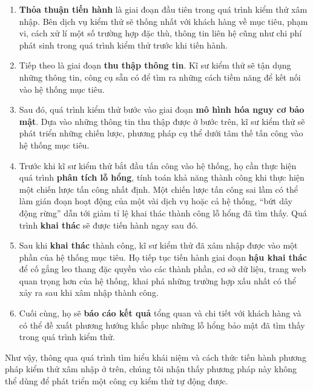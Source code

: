 \begin{enumerate}
    \item \textbf{Thỏa thuận tiến hành} là giai đoạn đầu tiên trong quá trình kiểm thử xâm nhập. Bên dịch vụ kiểm thử sẽ thống nhất với khách hàng về mục tiêu, phạm vi, cách xử lí một số trường hợp đặc thù, thông tin liên hệ cũng như chi phí phát sinh trong quá trình kiểm thử trước khi tiến hành.
    \item Tiếp theo là giai đoạn \textbf{thu thập thông tin}. Kĩ sư kiểm thử sẽ tận dụng những thông tin, công cụ sẵn có để tìm ra những cách tiềm năng để kết nối vào hệ thống mục tiêu.
    \item Sau đó, quá trình kiểm thử bước vào giai đoạn \textbf{mô hình hóa nguy cơ bảo mật}. Dựa vào những thông tin thu thập được ở bước trên, kĩ sư kiểm thử sẽ phát triển những chiến lược, phương pháp cụ thể dưới tâm thế tấn công vào hệ thống mục tiêu.
    \item Trước khi kĩ sư kiểm thử bắt đầu tấn công vào hệ thống, họ cần thực hiện quá trình \textbf{phân tích lỗ hổng}, tính toán khả năng thành công khi thực hiện một chiến lược tấn công nhất định. Một chiến lược tấn công sai lầm có thể làm gián đoạn hoạt động của một vài dịch vụ hoặc cả hệ thống, ``bứt dây động rừng'' dẫn tới giảm tỉ lệ khai thác thành công lỗ hổng đã tìm thấy. Quá trình \textbf{khai thác} sẽ được tiến hành ngay sau đó.
    \item Sau khi \textbf{khai thác} thành công, kĩ sư kiểm thử đã xâm nhập được vào một phần của hệ thống mục tiêu. Họ tiếp tục tiến hành giai đoạn \textbf{hậu khai thác} để cố gắng leo thang đặc quyền vào các thành phần, cơ sở dữ liệu, trang web quan trọng hơn của hệ thống, khai phá những trường hợp xấu nhất có thể xảy ra sau khi xâm nhập thành công.
    \item Cuối cùng, họ sẽ \textbf{báo cáo kết quả} tổng quan và chi tiết với khách hàng và có thể đề xuất phương hướng khắc phục những lỗ hổng bảo mật đã tìm thấy trong quá trình kiểm thử.
\end{enumerate}
Như vậy, thông qua quá trình tìm hiểu khái niệm và cách thức tiến hành phương pháp kiểm thử xâm nhập ở trên, chúng tôi nhận thấy phương pháp này không thể dùng để phát triển một công cụ kiểm thử tự động được.